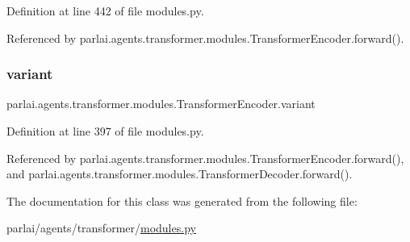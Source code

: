 Definition at line 442 of file modules.\+py.



Referenced by parlai.\+agents.\+transformer.\+modules.\+Transformer\+Encoder.\+forward().

\mbox{\label{classparlai_1_1agents_1_1transformer_1_1modules_1_1TransformerEncoder_a6ea46aeb8ca865c97ec8e99746bedd7b}} 
\subsubsection{\texorpdfstring{variant}{variant}}
{\footnotesize\ttfamily parlai.\+agents.\+transformer.\+modules.\+Transformer\+Encoder.\+variant}



Definition at line 397 of file modules.\+py.



Referenced by parlai.\+agents.\+transformer.\+modules.\+Transformer\+Encoder.\+forward(), and parlai.\+agents.\+transformer.\+modules.\+Transformer\+Decoder.\+forward().



The documentation for this class was generated from the following file\+:\begin{DoxyCompactItemize}
\item 
parlai/agents/transformer/\hyperlink{parlai_2agents_2transformer_2modules_8py}{modules.\+py}\end{DoxyCompactItemize}
